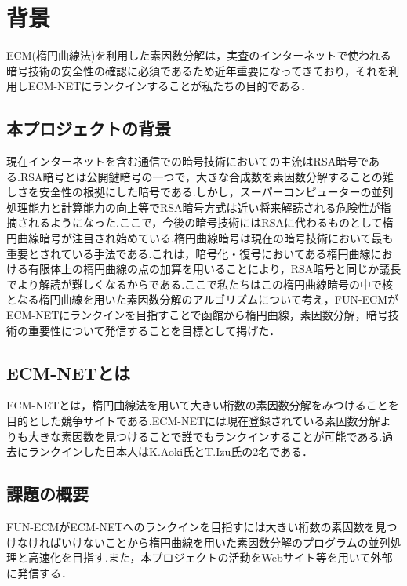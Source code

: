 \documentclass[openany,11pt,papersize]{jsbook}
\begin{document}
\chapter{背景}

ECM(楕円曲線法)を利用した素因数分解は，実査のインターネットで使われる暗号技術の安全性の確認に必須であるため近年重要になってきており，それを利用しECM-NETにランクインすることが私たちの目的である．


\section{本プロジェクトの背景}

現在インターネットを含む通信での暗号技術においての主流はRSA暗号である.RSA暗号とは公開鍵暗号の一つで，大きな合成数を素因数分解することの難しさを安全性の根拠にした暗号である.しかし，スーパーコンピューターの並列処理能力と計算能力の向上等でRSA暗号方式は近い将来解読される危険性が指摘されるようになった.ここで，今後の暗号技術にはRSAに代わるものとして楕円曲線暗号が注目され始めている.楕円曲線暗号は現在の暗号技術において最も重要とされている手法である.これは，暗号化・復号においてある楕円曲線における有限体上の楕円曲線の点の加算を用いることにより，RSA暗号と同じか議長でより解読が難しくなるからである.ここで私たちはこの楕円曲線暗号の中で核となる楕円曲線を用いた素因数分解のアルゴリズムについて考え，FUN-ECMがECM-NETにランクインを目指すことで函館から楕円曲線，素因数分解，暗号技術の重要性について発信することを目標として掲げた．


\section{ECM-NETとは}

ECM-NETとは，楕円曲線法を用いて大きい桁数の素因数分解をみつけることを目的とした競争サイトである.ECM-NETには現在登録されている素因数分解よりも大きな素因数を見つけることで誰でもランクインすることが可能である.過去にランクインした日本人はK.Aoki氏とT.Izu氏の2名である．


\section{課題の概要}\label{sec:gaiyou}

FUN-ECMがECM-NETへのランクインを目指すには大きい桁数の素因数を見つけなければいけないことから楕円曲線を用いた素因数分解のプログラムの並列処理と高速化を目指す.また，本プロジェクトの活動をWebサイト等を用いて外部に発信する．

\end{document}
